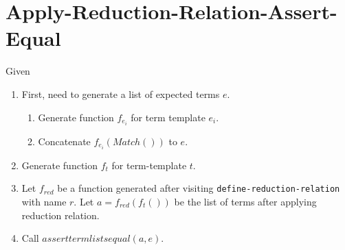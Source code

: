 \section{Apply-Reduction-Relation-Assert-Equal}

Given \ApplyReductionRelationAssertEqual
\begin{enumerate}
\item First, need to generate a list of expected terms $e$.
	\begin{enumerate}
	\item Generate function $f_{e_i}$ for term template $e_i$.
	\item Concatenate $f_{e_i}(Match())$ to $e$.
	\end{enumerate}
\item Generate function $f_t$ for term-template $t$.
\item Let $f_{red}$ be a function generated after visiting \texttt{define-reduction-relation} with name $r$. Let $a=f_{red}(f_t())$ be the list of terms after applying reduction relation.
\item Call $asserttermlistsequal(a, e)$.
\end{enumerate}
